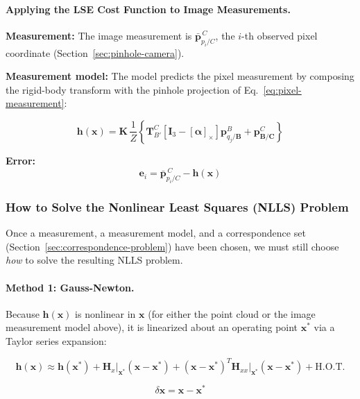 \documentclass{article}
\newcommand{\vect}[1]{\mathbf{#1}}
\newcommand{\mat}[1]{\mathbf{#1}}
\newcommand{\pBjB}{\vect{p}^{\mathit{B}}_{q_{j}/\mathbf{B}}}
\newcommand{\pBCC}{\vect{p}^{\mathit{C}}_{\mathbf{B}/\mathbf{C}}}
\newcommand{\Kmat}{\mat{K}} %
\newcommand{\rotErr}{\vect{\alpha}} %
\newcommand{\skewop}[1]{\left[#1\right]_{\times}} %
\newcommand{\stateVec}{\vect{x}}
\newcommand{\dstate}{\delta\vect{x}}
\newcommand{\err}{\vect{e}}
\newcommand{\Jac}{\mat{H}_x} %
\begin{document}
\paragraph{Applying the LSE Cost Function to Image Measurements.}

\textbf{Measurement:} The image measurement is $\bar{\vect{p}}^{\,C}_{p_i/C}$, the $i$-th observed pixel coordinate (Section~\ref{sec:pinhole-camera}).

\textbf{Measurement model:} The model predicts the pixel measurement by composing the rigid-body transform with the pinhole projection of Eq.~\eqref{eq:pixel-measurement}:

\begin{equation}
    \vect{h}(\stateVec) = \Kmat \, \frac{1}{Z}\left\{ \mat{T}^{C}_{B'} \left[ \mat{I}_3 - \skewop{\rotErr} \right] \pBjB + \pBCC \right\}
\end{equation}

\textbf{Error:}
\begin{equation}
    \err_i = \bar{\vect{p}}^{\,C}_{p_i/C} - \vect{h}(\stateVec)
\end{equation}

\subsubsection{How to Solve the Nonlinear Least Squares (NLLS) Problem}

Once a measurement, a measurement model, and a correspondence set (Section~\ref{sec:correspondence-problem}) have been chosen, we must still choose \emph{how} to solve the resulting NLLS problem.

\paragraph{Method 1: Gauss-Newton.}

Because $\vect{h}(\stateVec)$ is nonlinear in $\stateVec$ (for either the point cloud or the image measurement model above), it is linearized about an operating point $\stateVec^*$ via a Taylor series expansion:

\begin{equation}
    \vect{h}(\stateVec) \approx \vect{h}(\stateVec^*) + \Jac\Big|_{\stateVec^*} (\stateVec - \stateVec^*) + (\stateVec - \stateVec^*)^T \mat{H}_{xx}\Big|_{\stateVec^*} (\stateVec - \stateVec^*) + \text{H.O.T.}
\end{equation}

\begin{equation}
    \dstate = \stateVec - \stateVec^*
\end{equation}
\end{document}
